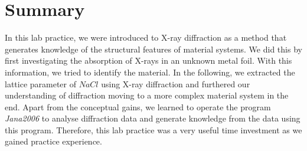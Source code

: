 

\chapter{Summary}
\label{chap:fazit}

In this lab practice, we were introduced to X-ray diffraction as a method that generates knowledge of the structural features of material systems. We did this by first investigating the absorption of X-rays in an unknown metal foil. With this information, we tried to identify the material. In the following, we extracted the lattice parameter of $NaCl$ using X-ray diffraction and furthered our understanding of diffraction moving to a more complex material system in the end. Apart from the conceptual gains, we learned to operate the program \textit{Jana2006} to analyse diffraction data and generate knowledge from the data using this program. Therefore, this lab practice was a very useful time investment as we gained practice experience.


